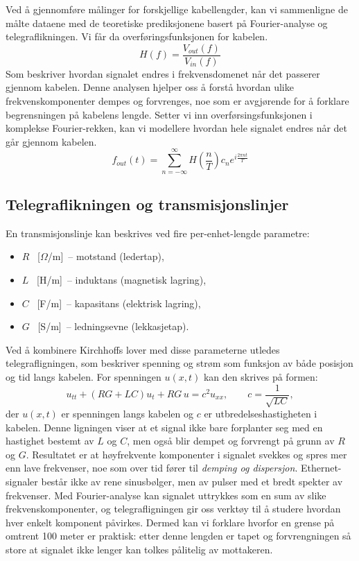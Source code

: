 Ved å gjennomføre målinger for forskjellige kabellengder, kan vi sammenligne de målte dataene med de teoretiske prediksjonene basert på Fourier-analyse og telegraflikningen.
Vi får da overføringsfunksjonen for kabelen.
\begin{equation}
    H(f) = \frac{V_{out}(f)}{V_{in}(f)}
\end{equation}
Som beskriver hvordan signalet endres i frekvensdomenet når det passerer gjennom kabelen.
Denne analysen hjelper oss å forstå hvordan ulike frekvenskomponenter dempes og forvrenges, noe som er avgjørende for å forklare begrensningen på kabelens lengde.
Setter vi inn overførsingsfunksjonen i komplekse Fourier-rekken, kan vi modellere hvordan hele signalet endres når det går gjennom kabelen.
\begin{equation}
    f_{out}(t) = \sum_{n=-\infty}^{\infty} H\left(\frac{n}{T}\right) c_n e^{i \frac{2\pi n t}{T}}
\end{equation}
\subsection{Telegraflikningen og transmisjonslinjer}
En transmisjonslinje kan beskrives ved fire per-enhet-lengde parametre:
\begin{itemize}
    \item $R$ \, [$\Omega$/m] \,-- motstand (ledertap),
    \item $L$ \, [H/m] \,-- induktans (magnetisk lagring),
    \item $C$ \, [F/m] \,-- kapasitans (elektrisk lagring),
    \item $G$ \, [S/m] \,-- ledningsevne (lekkasjetap).
\end{itemize}
Ved å kombinere Kirchhoffs lover med disse parameterne utledes telegrafligningen, som beskriver spenning og strøm som funksjon av både posisjon og tid langs kabelen. For spenningen $u(x,t)$ kan den skrives på formen:
\begin{equation}
    u_{tt} + (RG + LC)u_t + RG\,u = c^2 u_{xx}, \qquad c = \frac{1}{\sqrt{LC}} ,
\end{equation}
der $u(x,t)$ er spenningen langs kabelen og $c$ er utbredelseshastigheten i kabelen.  
Denne ligningen viser at et signal ikke bare forplanter seg med en hastighet bestemt av $L$ og $C$, men også blir dempet og forvrengt på grunn av $R$ og $G$. Resultatet er at høyfrekvente komponenter i signalet svekkes og spres mer enn lave frekvenser, noe som over tid fører til \emph{demping og dispersjon}.  
Ethernet-signaler består ikke av rene sinusbølger, men av pulser med et bredt spekter av frekvenser. Med Fourier-analyse kan signalet uttrykkes som en sum av slike frekvenskomponenter, og telegrafligningen gir oss verktøy til å studere hvordan hver enkelt komponent påvirkes. Dermed kan vi forklare hvorfor en grense på omtrent 100 meter er praktisk: etter denne lengden er tapet og forvrengningen så store at signalet ikke lenger kan tolkes pålitelig av mottakeren.


